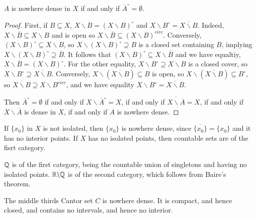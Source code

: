 \begin{lem}
    $A$ is nowhere dense in $X$ if and only if $\overline{A}^{\circ} = \emptyset$.
\end{lem}
\begin{proof}
    First, if $B \subseteq X$, $X\backslash \overline{B} = (X\backslash B)^{\circ}$ and $X\backslash B^{\circ} = \overline{X\backslash B}$. Indeed, $X\backslash \overline{B} \subseteq X\backslash B$ and is open so $X\backslash \overline{B} \subseteq (X\backslash B)^{circ}$. Conversely, $(X\backslash B)^{\circ} \subseteq X\backslash B$, so $X\backslash(X\backslash B)^{\circ} \supseteq B$ is a closed set containing $B$, implying $X\backslash(X\backslash B)^{\circ} \supseteq \overline{B}$. It follows that $(X\backslash B)^{\circ} \subseteq X\backslash\overline{B}$ and we have equaltiy, $X\backslash\overline{B} = (X\backslash B)^{\circ}$. For the other equality, $X\backslash B^{\circ} \supseteq X\backslash B$ is a closed cover, so $X\backslash B^{\circ} \supseteq \overline{X\backslash B}$. Conversely, $X\backslash (\overline{X\backslash B})\subseteq B$ is open, so $X\backslash(\overline{X\backslash B}) \subseteq B^{\circ}$, so $\overline{X\backslash B}\supseteq X\backslash B^{circ}$, and we have equality $X\backslash B^{\circ} = \overline{X\backslash B}$.


    Then $\overline{A}^{\circ} = \emptyset$ if and only if $X\backslash \overline{A}^{\circ} = X$, if and only if $\overline{X\backslash \overline{A}} = X$, if and only if $X\backslash\overline{A}$ is dense in $X$, if and only if $A$ is nowhere dense.
\end{proof}

\begin{eg}
    If $\{x_0\}$ in $X$ is not isolated, then $\{x_0\}$ is nowhere dense, since $\overline{\{x_0\}} = \{x_0\}$ and it has no interior points. If $X$ has no isolated points, then countable sets are of the fisrt category.
\end{eg}

\begin{eg}
    $\mathbb Q$ is of the first category, being the countable union of singletons and having no isolated points. $\mathbb R\backslash\mathbb Q$ is of the second category, which follows from Baire's theorem.
\end{eg}

\begin{eg}
    The middle thirds Cantor set $C$ is nowhere dense. It is compact, and hence closed, and contains no intervals, and hence no interior.
\end{eg}

